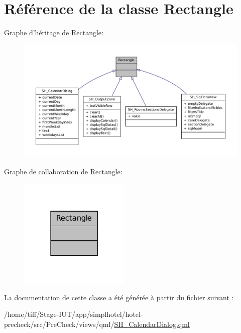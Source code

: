 \hypertarget{classRectangle}{\section{Référence de la classe Rectangle}
\label{classRectangle}
}


Graphe d'héritage de Rectangle\-:\nopagebreak
\begin{figure}[H]
\begin{center}
\leavevmode
\includegraphics[width=350pt]{classRectangle__inherit__graph}
\end{center}
\end{figure}


Graphe de collaboration de Rectangle\-:\nopagebreak
\begin{figure}[H]
\begin{center}
\leavevmode
\includegraphics[width=150pt]{classRectangle__coll__graph}
\end{center}
\end{figure}


La documentation de cette classe a été générée à partir du fichier suivant \-:\begin{DoxyCompactItemize}
\item 
/home/tiff/\-Stage-\/\-I\-U\-T/app/simplhotel/hotel-\/precheck/src/\-Pre\-Check/views/qml/\hyperlink{SH__CalendarDialog_8qml}{S\-H\-\_\-\-Calendar\-Dialog.\-qml}\end{DoxyCompactItemize}
